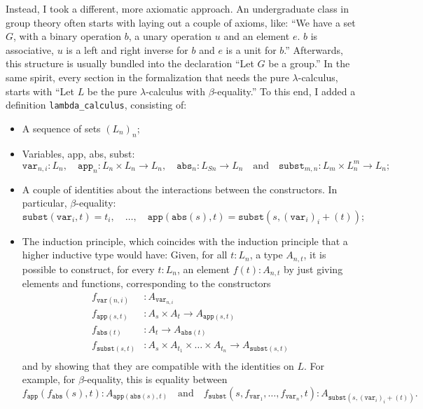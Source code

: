 Instead, I took a different, more axiomatic approach. An undergraduate class in group theory often starts with laying out a couple of axioms, like: ``We have a set $ G $, with a binary operation $ b $, a unary operation $ u $ and an element $ e $. $ b $ is associative, $ u $ is a left and right inverse for $ b $ and $ e $ is a unit for $ b $.'' Afterwards, this structure is usually bundled into the declaration ``Let $ G $ be a group.'' In the same spirit, every section in the formalization that needs the pure $ \lambda $-calculus, starts with ``Let $ L $ be the pure $ \lambda $-calculus with $ \beta $-equality.'' To this end, I added a definition \texttt{lambda\_calculus}, consisting of:
\begin{itemize}
  \item A sequence of sets $ (L_n)_n $;
  \item Variables, app, abs, subst:
    \[ \mathtt{var}_{n, i} : L_n, \quad \mathtt{app}_n: L_n \times L_n \to L_n, \quad \mathtt{abs}_n : L_{S n} \to L_n \quad \text{and} \quad \mathtt{subst}_{m, n}: L_m \times L_n^m \to L_n; \]
  \item A couple of identities about the interactions between the constructors. In particular, $ \beta $-equality:
    \[
      \mathtt{subst}(\mathtt{var}_i, t) = t_i, \quad
      \dots, \quad
      \mathtt{app}(\mathtt{abs}(s), t) = \mathtt{subst}(s, (\mathtt{var}_i)_i + (t));
    \]
  \item The induction principle, which coincides with the induction principle that a higher inductive type would have: Given, for all $ t : L_n $, a type $ A_{n, t} $, it is possible to construct, for every $ t : L_n $, an element $ f(t) : A_{n, t} $ by just giving elements and functions, corresponding to the constructors
    \begin{align*}
      f_{\mathtt{var}(n, i)} &:A_{\mathtt{var}_{n, i}}\\
      f_{\mathtt{app}(s, t)} &:A_s \times A_t \to A_{\mathtt{app}(s, t)}\\
      f_{\mathtt{abs}(t)} &:A_t \to A_{\mathtt{abs}(t)}\\
      f_{\mathtt{subst}(s, t)} &:A_s \times A_{t_1} \times \dots \times A_{t_n} \to A_{\mathtt{subst}(s, t)}\\
    \end{align*}
    and by showing that they are compatible with the identities on $ L $. For example, for $ \beta $-equality, this is equality between
    \[ f_{\mathtt{app}}(f_{\mathtt{abs}}(s), t): A_{\mathtt{app}(\mathtt{abs}(s), t)} \quad \text{and} \quad f_{\mathtt{subst}}(s, f_{\mathtt{var}_1}, \dots, f_{\mathtt{var}_n}, t): A_{\mathtt{subst}(s, (\mathtt{var}_i)_i + (t))}. \]

\end{itemize}
